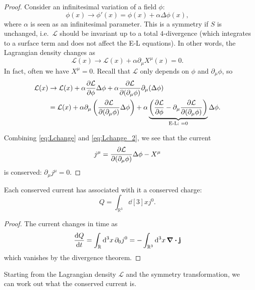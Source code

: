 \begin{proof}

  Consider an infinitesimal variation of a field $\phi$:
  \begin{equation}
    \phi(x) \to \phi'(x) = \phi(x) + \alpha \Delta \phi(x),
  \end{equation} 
  where $\alpha$ is seen as an infinitesimal parameter.
  This is a symmetry if $S$ is unchanged, i.e.~$\mathcal{L}$ should be invariant up to a total $4$-divergence (which integrates to a surface term and does not affect the E-L equations).
  In other words, the Lagrangian density changes as
  \begin{equation}
    \label{eq:Lchange}
    \mathcal{L}(x) \to \mathcal{L}(x) + \alpha \partial_\mu X^\mu(x) = 0.
  \end{equation}
  In fact, often we have $X^\mu = 0$.
  Recall that $\mathcal{L}$ only depends on $\phi$ and $\partial_\mu \phi$, so
  \begin{align}
    \mathcal{L}(x) &\to \mathcal{L}(x) + \alpha \pdv{\mathcal{L}}{\phi} \Delta \phi + \alpha \pdv{\mathcal{L}}{(\partial_\mu \phi)} \partial_\mu(\Delta \phi) \\
    \label{eq:Lchange_2}
    &= \mathcal{L}(x) + \alpha \partial_\mu \left( \pdv{\mathcal{L}}{(\partial_\mu \phi)} \Delta \phi \right) + \alpha \underbrace{\left( \pdv{\mathcal{L}}{\phi} - \partial_\mu \pdv{\mathcal{L}}{(\partial_\mu \phi)} \right)}_{\text{E-L: } = 0} \Delta \phi.
  \end{align}

  Combining \eqref{eq:Lchange} and \eqref{eq:Lchange_2}, we see that the current
  \begin{equation}
    j^\mu = \pdv{\mathcal{L}}{(\partial_\mu \phi)} \Delta \phi - X^\mu
  \end{equation}
  is conserved: $\partial_\mu j^\mu = 0$.
\end{proof}
\begin{leftbar}
  \begin{remark}
    Each conserved current has associated with it a conserved charge:
    \begin{equation}
      Q = \int_{\mathbb{R}^3}^{} \dd[3]{x} j^0.
    \end{equation}
    \begin{proof}
      The current changes in time as
      \begin{equation}
	\dv{Q}{t} = \int_{\mathbb{R}}^{} \dd[3]{x} \partial_0 j^0 = - \int_{\mathbb{R}^3}^{} \dd[3]{x} \div \vb{j}
      \end{equation}
      which vanishes by the divergence theorem.
    \end{proof}
    Starting from the Lagrangian density $\mathcal{L}$ and the symmetry transformation, we can work out what the conserved current is.
  \end{remark}
\end{leftbar}

